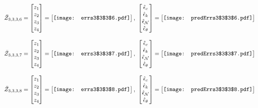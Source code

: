\documentclass[12pt]{article}
\begin{document}
\begin{gather*}
\bar{\mathcal{Z}}_{3,3,3,6}=\begin{bmatrix}
z_1\\
z_2\\
z_3\\
z_4
 \end{bmatrix}= \begin{bmatrix}
\vcenter{\hbox{\texttt{[image: errs3\$3\$3\$6.pdf]}}}
 \end{bmatrix},\,\, \begin{bmatrix}
\hat{\epsilon}_c\\\hat{\epsilon}_k\\\hat{\epsilon}_\mathcal{N}\\\hat{\epsilon}_\theta
 \end{bmatrix}=\begin{bmatrix}
\vcenter{\hbox{\texttt{[image: predErrs3\$3\$3\$6.pdf]}}}
 \end{bmatrix}
\end{gather*}


\begin{gather*}
\bar{\mathcal{Z}}_{3,3,3,7}=\begin{bmatrix}
z_1\\
z_2\\
z_3\\
z_4
 \end{bmatrix}= \begin{bmatrix}
\vcenter{\hbox{\texttt{[image: errs3\$3\$3\$7.pdf]}}}
 \end{bmatrix},\,\, \begin{bmatrix}
\hat{\epsilon}_c\\\hat{\epsilon}_k\\\hat{\epsilon}_\mathcal{N}\\\hat{\epsilon}_\theta
 \end{bmatrix}=\begin{bmatrix}
\vcenter{\hbox{\texttt{[image: predErrs3\$3\$3\$7.pdf]}}}
 \end{bmatrix}
\end{gather*}


\begin{gather*}
\bar{\mathcal{Z}}_{3,3,3,8}=\begin{bmatrix}
z_1\\
z_2\\
z_3\\
z_4
 \end{bmatrix}= \begin{bmatrix}
\vcenter{\hbox{\texttt{[image: errs3\$3\$3\$8.pdf]}}}
 \end{bmatrix},\,\, \begin{bmatrix}
\hat{\epsilon}_c\\\hat{\epsilon}_k\\\hat{\epsilon}_\mathcal{N}\\\hat{\epsilon}_\theta
 \end{bmatrix}=\begin{bmatrix}
\vcenter{\hbox{\texttt{[image: predErrs3\$3\$3\$8.pdf]}}}
 \end{bmatrix}
\end{gather*}
\end{document}
